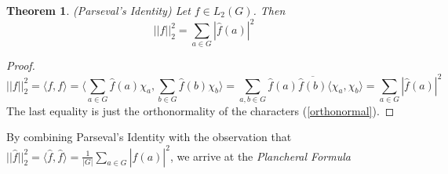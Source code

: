 \documentclass{amsart}
\newtheorem{theorem}{Theorem}[section]
\theoremstyle{definition}
\theoremstyle{remark}
\numberwithin{equation}{section}
\theoremstyle{remark}
\begin{document}
\begin{theorem}{(Parseval's Identity)}
  Let $f \in L_2(G)$. Then
  $$ ||f||_2^2 = \sum_{a \in G} |\hat{f}(a)|^2$$
\end{theorem}
%
\begin{proof}
  $$ ||f||^2_2 = \langle f, f \rangle = \langle \sum_{a \in G} \hat{f}(a) \chi_a,  \sum_{b \in G} \hat{f}(b) \chi_b \rangle = \sum_{a,b \in G} \hat{f}(a)\overline{\hat{f}(b)}\langle \chi_a, \chi_b \rangle = \sum_{a \in G} |\hat{f}(a)|^2 $$
  The last equality is just the orthonormality of the characters (\ref{orthonormal}).
\end{proof}

\noindent By combining Parseval's Identity with the observation that $||\hat{f}||_2^2 = \langle \hat{f}, \hat{f} \rangle = \frac{1}{|G|}\sum_{a \in G} |\hat{f}(a)|^2$, we arrive at the \emph{Plancheral Formula}
\end{document}
